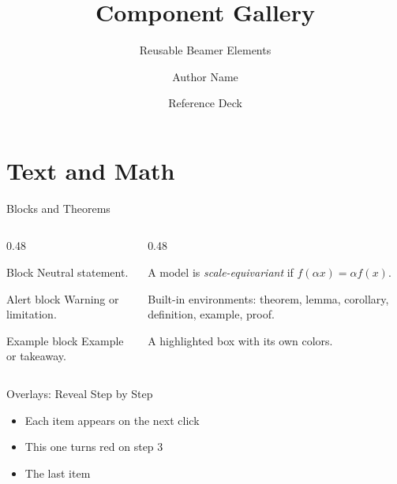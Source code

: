 \documentclass[aspectratio=169,10pt]{beamer}
\title[Components]{Component Gallery}
\subtitle{Reusable Beamer Elements}
\author[A.~Author]{Author Name}
\institute[Univ.]{Institution}
\date{Reference Deck}
\begin{document}
\begin{frame}
  \titlepage
\end{frame}

\section{Text and Math}

\begin{frame}{Blocks and Theorems}
  \begin{columns}[T]
    \begin{column}{0.48\textwidth}
      \begin{block}{Block}
        Neutral statement.
      \end{block}
      \begin{alertblock}{Alert block}
        Warning or limitation.
      \end{alertblock}
      \begin{exampleblock}{Example block}
        Example or takeaway.
      \end{exampleblock}
    \end{column}
    \begin{column}{0.48\textwidth}
      \begin{definition}
        A model is \emph{scale-equivariant} if $f(\alpha x) = \alpha f(x)$.
      \end{definition}
      \begin{theorem}
        Built-in environments: theorem, lemma, corollary, definition, example, proof.
      \end{theorem}
      \begin{keybox}[tcolorbox]
        A highlighted box with its own colors.
      \end{keybox}
    \end{column}
  \end{columns}
\end{frame}

\begin{frame}{Overlays: Reveal Step by Step}
  \begin{itemize}[<+->]
    \item Each item appears on the next click
    \item \alert<3>{This one turns red on step 3}
    \item The last item
  \end{itemize}
\end{frame}
\end{document}
